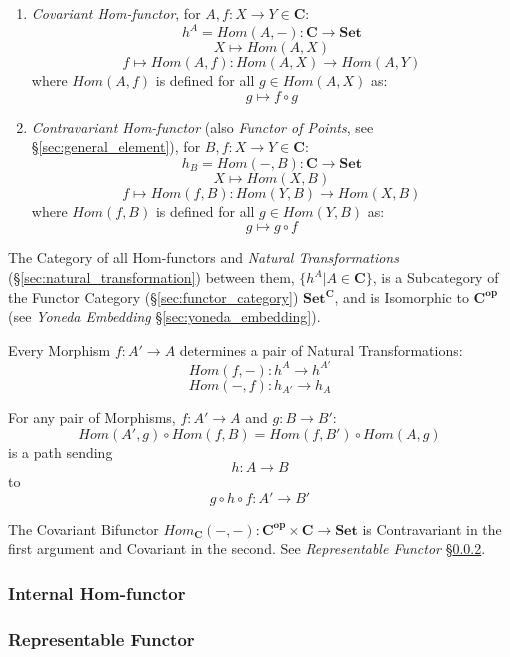 \begin{enumerate}
    \item \emph{Covariant Hom-functor}, for $A,f : X \rightarrow Y \in
      \mathbf{C}$:
\[
    h^A = Hom(A,-) : \mathbf{C} \rightarrow \mathbf{Set}
\]\[
    X \mapsto Hom(A,X)
\]\[
    f \mapsto Hom(A,f) : Hom(A,X) \rightarrow Hom(A,Y)
\]
    where $Hom(A,f)$ is defined for all $g \in Hom(A,X)$ as:
\[
    g \mapsto f \circ g
\]

    \item \emph{Contravariant Hom-functor} (also \emph{Functor of
      Points}, see \S\ref{sec:general_element}), for $B,f : X
      \rightarrow Y \in \mathbf{C}$:
\[
    h_B = Hom(-,B) : \mathbf{C} \rightarrow \mathbf{Set}
\]\[
    X \mapsto Hom(X,B)
\]\[
    f \mapsto Hom(f,B) : Hom(Y,B) \rightarrow Hom(X,B)
\]
    where $Hom(f,B)$ is defined for all $g \in Hom(Y,B)$ as:
\[
    g \mapsto g \circ f
\]
\end{enumerate}

The Category of all Hom-functors and \emph{Natural Transformations}
(\S\ref{sec:natural_transformation}) between them, $\{ h^A | A \in
\mathbf{C} \}$, is a Subcategory of the Functor Category
(\S\ref{sec:functor_category}) $\mathbf{Set^C}$, and is Isomorphic
to $\mathbf{C^{op}}$ (see \emph{Yoneda Embedding}
\S\ref{sec:yoneda_embedding}).

Every Morphism $f : A' \rightarrow A$ determines a pair of Natural
Transformations:
\[
    Hom(f,-) : h^A \rightarrow h^{A'}
\]\[
    Hom(-,f) : h_{A'} \rightarrow h_A
\]

For any pair of Morphisms, $f : A' \rightarrow A$ and $g : B
\rightarrow B'$:
\[
    Hom(A',g) \circ Hom(f,B) = Hom(f,B') \circ Hom(A,g)
\]
is a path sending
\[
    h : A \rightarrow B
\]
to
\[
    g \circ h \circ f : A' \rightarrow B'
\]

The Covariant Bifunctor $Hom_{\mathbf{C}}(-,-) : \mathbf{C^{op}}
\times \mathbf{C} \rightarrow \mathbf{Set}$ is Contravariant in the
first argument and Covariant in the second. See \emph{Representable
  Functor} \S\ref{sec:representable_functor}.



\subsubsection{Internal Hom-functor}\label{sec:internal_homfunctor}



\subsubsection{Representable Functor}\label{sec:representable_functor}

